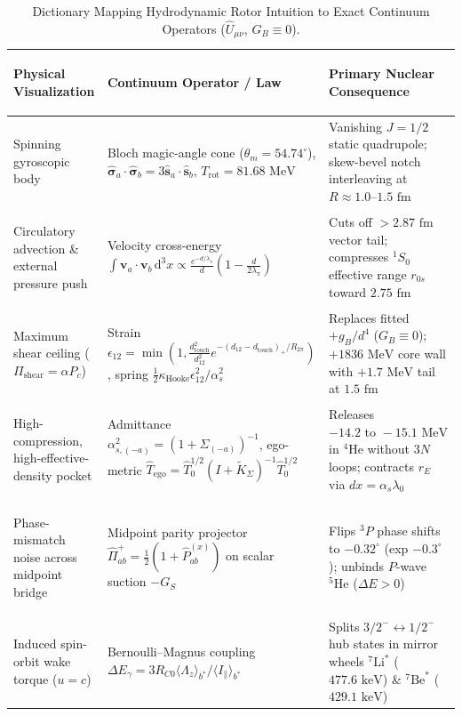 \documentclass[11pt, a4paper]{article}
\DeclareRobustCommand{\dd}{\mathrm{d}}
\DeclareRobustCommand{\dtouch}{d_{\mathrm{touch}}}
\begin{document}
\begin{table}[!htbp]
\centering
\caption{Dictionary Mapping Hydrodynamic Rotor Intuition to Exact Continuum Operators ($\hat{U}_{\mu\nu}$, $G_B \equiv 0$).}
\label{tab:intuition_dictionary}
\footnotesize
\setlength{\tabcolsep}{4.5pt}
\renewcommand{\arraystretch}{1.18}
\begin{tabularx}{\textwidth}{>{\bfseries\raggedright\arraybackslash}p{} >{\raggedright\arraybackslash}p{} >{\raggedright\arraybackslash}X}
\toprule
Physical Visualization & Continuum Operator / Law & Primary Nuclear Consequence \\
\midrule
Spinning gyroscopic body & Bloch magic-angle cone ($\theta_m = 54.74^\circ$), $\hat{\boldsymbol{\sigma}}_a\cdot\hat{\boldsymbol{\sigma}}_b = 3\hat{\mathbf{s}}_a\cdot\hat{\mathbf{s}}_b$, $T_{\mathrm{rot}} = 81.68\text{ MeV}$ & Vanishing $J=1/2$ static quadrupole; skew-bevel notch interleaving at $R \approx 1.0\text{--}1.5\text{ fm}$ \\
Circulatory advection \& external pressure push & Velocity cross-energy $\int \mathbf{v}_a\cdot\mathbf{v}_b\,\dd^3x \propto \frac{e^{-d/\lambda_\pi}}{d}(1 - \frac{d}{2\lambda_\pi})$ & Cuts off $>2.87\text{ fm}$ vector tail; compresses $^1S_0$ effective range $r_{0s}$ toward $2.75\text{ fm}$ \\
Maximum shear ceiling ($\Pi_{\mathrm{shear}} = \alpha P_c$) & Strain $\epsilon_{12} = \min(1, \frac{\dtouch^2}{d_{12}^2}e^{-(d_{12}-\dtouch)_+/R_{2\pi}})$, spring $\frac{1}{2}\kappa_{\mathrm{Hooke}}\epsilon_{12}^2/\alpha_s^2$ & Replaces fitted $+g_B/d^4$ ($G_B \equiv 0$); $+1836\text{ MeV}$ core wall with $+1.7\text{ MeV}$ tail at $1.5\text{ fm}$ \\
High-compression, high-effective-density pocket & Admittance $\alpha_{s,(-a)}^2 = (1 + \Sigma_{(-a)})^{-1}$, ego-metric $\hat{T}_{\mathrm{ego}} = \hat{T}_0^{1/2}(I + \tilde{K}_\Sigma)^{-1}\hat{T}_0^{1/2}$ & Releases $-14.2\text{ to }-15.1\text{ MeV}$ in $^4\text{He}$ without $3N$ loops; contracts $r_E$ via $dx = \alpha_s\lambda_0$ \\
Phase-mismatch noise across midpoint bridge & Midpoint parity projector $\hat{\Pi}_{ab}^+ = \frac{1}{2}(1 + \hat{P}_{ab}^{(x)})$ on scalar suction $-G_S$ & Flips $^3P$ phase shifts to $-0.32^\circ$ (exp $-0.3^\circ$); unbinds $P$-wave $^5\text{He}$ ($\Delta E > 0$) \\
Induced spin-orbit wake torque ($u = c$) & Bernoulli--Magnus coupling $\Delta E_\gamma = 3 R_{C0}\langle\Lambda_z\rangle_{b^*}/\langle I_\parallel\rangle_{b^*}$ & Splits $3/2^- \leftrightarrow 1/2^-$ hub states in mirror wheels $^7\text{Li}^*$ ($477.6\text{ keV}$) \& $^7\text{Be}^*$ ($429.1\text{ keV}$) \\
\bottomrule
\end{tabularx}
\end{table}
\end{document}
